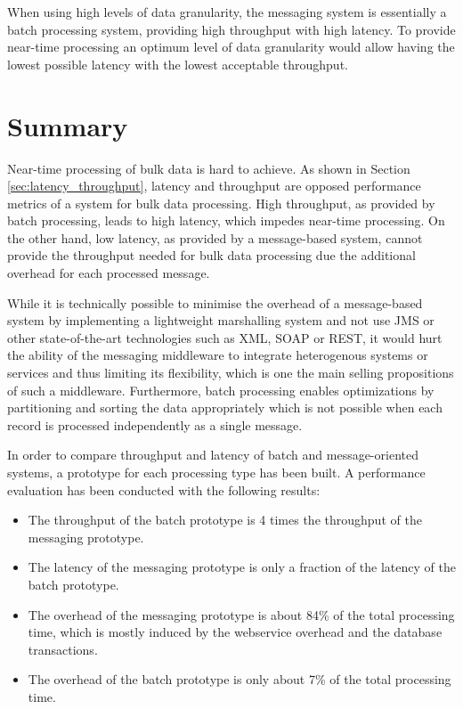 When using high levels of data granularity, the messaging system is essentially a batch processing system, providing high throughput with high latency. To provide near-time processing an optimum level of data granularity would allow having the lowest possible latency with the lowest acceptable throughput.

\section{Summary}\label{sec:perf_summary}
Near-time processing of bulk data is hard to achieve. As shown in Section \ref{sec:latency_throughput}, latency and throughput are opposed performance metrics of a system for bulk data processing. High throughput, as provided by batch processing, leads to high latency, which impedes near-time processing. On the other hand, low latency, as provided by a message-based system, cannot provide the throughput needed for bulk data processing due the additional overhead for each processed message.

While it is technically possible to minimise the overhead of a message-based system by implementing a lightweight marshalling system and not use JMS or other state-of-the-art technologies such as XML, SOAP or REST, it would hurt the ability of the messaging middleware to integrate heterogenous systems or services and thus limiting its flexibility, which is one the main selling propositions of such a middleware. Furthermore, batch processing enables optimizations by partitioning and sorting the data appropriately which is not possible when each record is processed independently as a single message.

In order to compare throughput and latency of batch and message-oriented systems, a prototype for each processing type has been built. A performance evaluation has been conducted with the following results:
\begin{itemize}
	\item The throughput of the batch prototype is 4 times the throughput of the messaging prototype.
	\item The latency of the messaging prototype is only a fraction of the latency of the batch prototype.
	\item The overhead of the messaging prototype is about 84\% of the total processing time, which is mostly induced by the webservice overhead and the database transactions. 
	\item The overhead of the batch prototype is only about 7\% of the total processing time.
\end{itemize}

